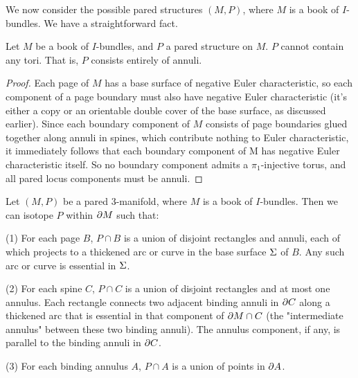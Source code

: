 We now consider the possible pared structures $(M,P)$, where $M$ is a book of
$I$-bundles. We have a straightforward fact.

\begin{prop}\label{P:annuli}

Let $M$ be a book of $I$-bundles, and $P$ a pared structure on $M$. $P$ cannot
contain any tori.  That is, $P$ consists entirely of annuli.

\end{prop}

\begin{proof}

Each page of $M$ has a base surface of negative Euler characteristic, so each
component of a page boundary must also have negative Euler characteristic (it's
either a copy or an orientable double cover of the base surface, as discussed
earlier). Since each boundary component of $M$ consists of page boundaries
glued together along annuli in spines, which contribute nothing to Euler
characteristic, it immediately follows that each boundary component of M has
negative Euler characteristic itself. So no boundary component admits
a $\pi_1$-injective torus, and all pared locus components must be annuli.

\end{proof}

\begin{lemma}\label{L:pareddecomp}

Let $(M,P)$ be a pared $3$-manifold, where $M$ is a book of $I$-bundles. Then we
can isotope $P$ within $\partial M$ such that:

(1) For each page $B$, $P \cap B$ is a union of disjoint rectangles and annuli,
each of which projects to a thickened arc or curve in the base surface $\Sigma$ of
$B$.  Any such arc or curve is essential in $\Sigma$.

(2) For each spine $C$, $P \cap C$ is a union of disjoint rectangles and at
most one annulus.  Each rectangle connects two adjacent binding annuli in $\partial
C$ along a thickened arc that is essential in that component of $\partial M \cap C$
(the "intermediate annulus" between these two binding annuli). The annulus
component, if any, is parallel to the binding annuli in $\partial C$.

(3) For each binding annulus $A$, $P \cap A$ is a union of points in $\partial A$.

\end{lemma}


